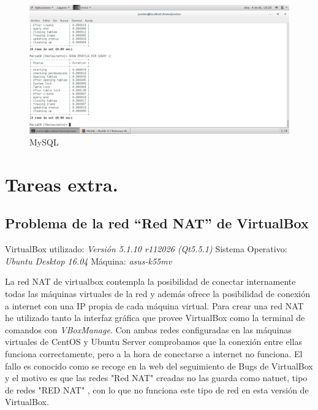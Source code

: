 \begin{figure}[H] %
\centering
\includegraphics[scale=0.4]{./imagenes/P3_9_3.png} 
\caption{MySQL } \label{fig:P3_9_3}
\end{figure}



\section{Tareas extra.}
\subsection{Problema de la red ``Red NAT'' de VirtualBox}
VirtualBox utilizado: \textit{Versión 5.1.10 r112026 (Qt5.5.1)}
Sistema Operativo:	\textit{Ubuntu Desktop 16.04}
Máquina:	\textit{asus-k55mv}

La red NAT de virtualbox contempla la posibilidad de conectar internamente todas las máquinas virtuales
de la red y además ofrece la posibilidad de conexión a internet con una IP propia de cada máquina virtual.
Para crear una red NAT he utilizado tanto la interfaz gráfica que provee VirtualBox como la terminal
de comandos con \textit{VBoxManage}. Con ambas redes configuradas en las máquinas virtuales de CentOS y
Ubuntu Server comprobamos que la conexión entre ellas funciona correctamente, pero a la hora de 
conectarse a internet no funciona. El fallo es conocido como se recoge en la web del seguimiento de Bugs
de VirtualBox y el motivo es que las redes "Red NAT" creadas no las guarda como natnet, tipo de redes "RED NAT"
, con lo que no funciona este tipo de red en esta versión de VirtualBox.


